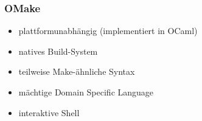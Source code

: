 \begin{frame}
	\frametitle{OMake}
	\begin{itemize}
		\pause
		\item plattformunabhängig (implementiert in OCaml)
		\pause
		\item natives Build-System
		\pause
		\item teilweise Make-ähnliche Syntax
		\pause
		\item mächtige Domain Specific Language
		\pause
		\item interaktive Shell
	\end{itemize}
\end{frame}
